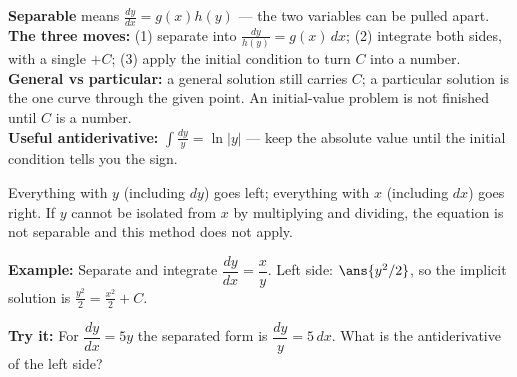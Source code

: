 \documentclass[12pt]{article}
\begin{document}

\begin{formulabox}
\textbf{Separable} means $\frac{dy}{dx} = g(x)h(y)$ --- the two variables can
be pulled apart.\\[3pt]
\textbf{The three moves:} (1) separate into $\frac{dy}{h(y)} = g(x)\,dx$;
(2) integrate both sides, with a single $+C$; (3) apply the initial condition
to turn $C$ into a number.\\[3pt]
\textbf{General vs particular:} a general solution still carries $C$; a
particular solution is the one curve through the given point. An
initial-value problem is not finished until $C$ is a number.\\[3pt]
\textbf{Useful antiderivative:} $\int \frac{dy}{y} = \ln|y|$ --- keep the
absolute value until the initial condition tells you the sign.
\end{formulabox}


\begin{formulabox}
Everything with $y$ (including $dy$) goes left; everything with $x$ (including
$dx$) goes right. If $y$ cannot be isolated from $x$ by multiplying and
dividing, the equation is not separable and this method does not apply.
\end{formulabox}

\begin{examplebox}
\textbf{Example:} Separate and integrate $\dfrac{dy}{dx} = \dfrac{x}{y}$.
Left side: $\ans{y^2/2}$, so the implicit solution is
$\frac{y^2}{2} = \frac{x^2}{2} + C$.
\end{examplebox}

\begin{tryitbox}
\textbf{Try it:} For $\dfrac{dy}{dx} = 5y$ the separated form is
$\dfrac{dy}{y} = 5\,dx$. What is the antiderivative of the left side?\\[2pt]
\end{tryitbox}

\end{document}
